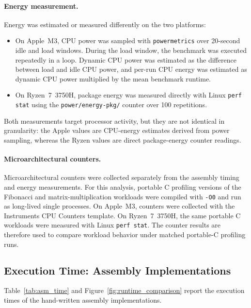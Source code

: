 \documentclass{tcsa}
\begin{document}
\paragraph{Energy measurement.}
Energy was estimated or measured differently on the two platforms:
\begin{itemize}
  \item On Apple~M3, CPU power was sampled with \texttt{powermetrics}
        over 20-second idle and load windows. During the load window,
        the benchmark was executed repeatedly in a loop. Dynamic CPU
        power was estimated as the difference between load and idle CPU
        power, and per-run CPU energy was estimated as dynamic CPU power
        multiplied by the mean benchmark runtime.
  \item On Ryzen~7~3750H, package energy was measured directly with
        Linux \texttt{perf stat} using the
        \texttt{power/energy-pkg/} counter over 100 repetitions.
\end{itemize}

Both measurements target processor activity, but they are not identical
in granularity: the Apple values are CPU-energy estimates derived from
power sampling, whereas the Ryzen values are direct package-energy
counter readings.

\paragraph{Microarchitectural counters.}
Microarchitectural counters were collected separately from the assembly
timing and energy measurements. For this analysis, portable C profiling
versions of the Fibonacci and matrix-multiplication workloads were
compiled with \texttt{-O0} and run as long-lived single processes. On
Apple~M3, counters were collected with the Instruments CPU Counters
template. On Ryzen~7~3750H, the same portable C workloads were measured
with Linux \texttt{perf stat}. The counter results are therefore used to
compare workload behavior under matched portable-C profiling runs.

\subsection{Execution Time: Assembly Implementations}
\label{sec:time_results}

Table~\ref{tab:asm_time} and Figure~\ref{fig:runtime_comparison}
report the execution times of the hand-written assembly
implementations.
\end{document}
